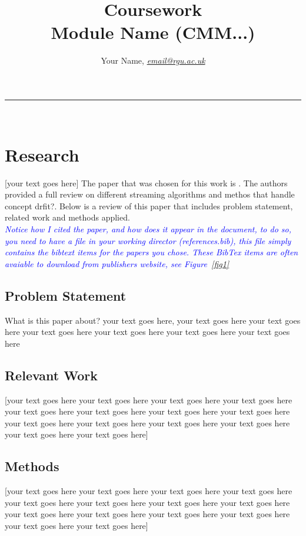 \documentclass[10pt]{article}
\begin{document}



\title{\LARGE Coursework  \\ Module Name (CMM...)}

\author{Your Name, \textit{\href{email@rgu.ac.uk}{email@rgu.ac.uk}}}
\maketitle
\noindent\rule{16cm}{0.4pt}
\ \\

\section{Research}

[your text goes here]
The paper that was chosen for this work is \cite{6779381}. The authors provided a full review on different streaming algorithms and methos that handle concept drfit?. Below is a review of this paper that includes problem statement, related work and methods applied.\\

\textcolor{blue}{\textit{Notice how I cited the paper, and how does it appear in the document, to do so, you need to have a file in your working director (references.bib), this file simply contains the bibtext items for the papers you chose. These BibTex items are often avaiable to download from publishers website, see Figure~\ref{fig1}}}
\subsection{Problem Statement}
What is this paper about? your text goes here, your text goes here your text goes here your text goes here your text goes here your text goes here your text goes here

\subsection{Relevant Work}
[your text goes here your text goes here your text goes here your text goes here your text goes here your text goes here your text goes here your text goes here your text goes here your text goes here your text goes here your text goes here your text goes here your text goes here]
\subsection{Methods}
[your text goes here your text goes here your text goes here your text goes here your text goes here your text goes here your text goes here your text goes here your text goes here your text goes here your text goes here your text goes here your text goes here your text goes here]
\end{document}
